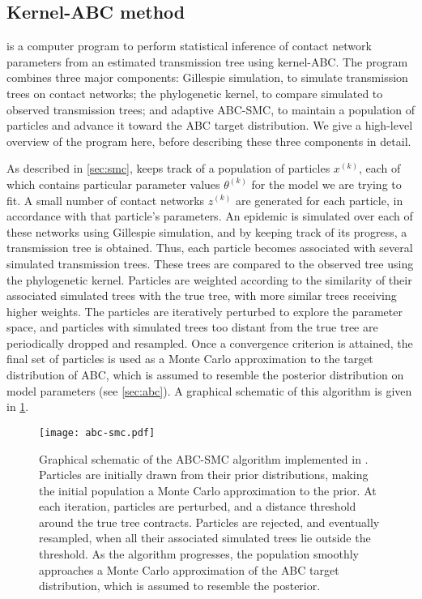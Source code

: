 \subsection{Kernel-ABC method}

 is a computer program to perform statistical inference of
contact network parameters from an estimated transmission tree using
kernel-\gls{ABC}. The program combines three major components: Gillespie
simulation, to simulate transmission trees on contact networks; the
phylogenetic kernel, to compare simulated to observed transmission trees; and
adaptive \gls{ABC}-\gls{SMC}, to maintain a population of particles and advance
it toward the \gls{ABC} target distribution. We give a high-level overview of
the program here, before describing these three components in detail.

As described in \cref{sec:smc},  keeps track of a population
of particles $x^{(k)}$, each of which contains particular parameter values
$\theta^{(k)}$ for the model we are trying to fit. A small number of contact
networks $z^{(k)}$ are generated for each particle, in accordance with that
particle's parameters. An epidemic is simulated over each of these networks
using Gillespie simulation, and by keeping track of its progress, a
transmission tree is obtained. Thus, each particle becomes associated with
several simulated transmission trees. These trees are compared to the observed
tree using the phylogenetic kernel. Particles are weighted according to the
similarity of their associated simulated trees with the true tree, with more
similar trees receiving higher weights. The particles are iteratively perturbed
to explore the parameter space, and particles with simulated trees too distant
from the true tree are periodically dropped and resampled. Once a convergence
criterion is attained, the final set of particles is used as a Monte Carlo
approximation to the target distribution of \gls{ABC}, which is assumed to
resemble the posterior distribution on model parameters (see \cref{sec:abc}). A
graphical schematic of this algorithm is given in \cref{fig:abcsmc}.

\begin{figure}
    \texttt{[image: abc-smc.pdf]}
    \caption[Graphical schematic of \gls{ABC}-\gls{SMC} algorithm.]{
      Graphical schematic of the \gls{ABC}-\gls{SMC} algorithm implemented in
      . Particles are initially drawn from their prior
      distributions, making the initial population a Monte Carlo approximation
      to the prior. At each iteration, particles are perturbed, and a distance
      threshold around the true tree contracts. Particles are rejected, and
      eventually resampled, when all their associated simulated trees lie
      outside the threshold. As the algorithm progresses, the population
      smoothly approaches a Monte Carlo approximation of the \gls{ABC} target
      distribution, which is assumed to resemble the posterior.
    }
    \label{fig:abcsmc}
\end{figure}


